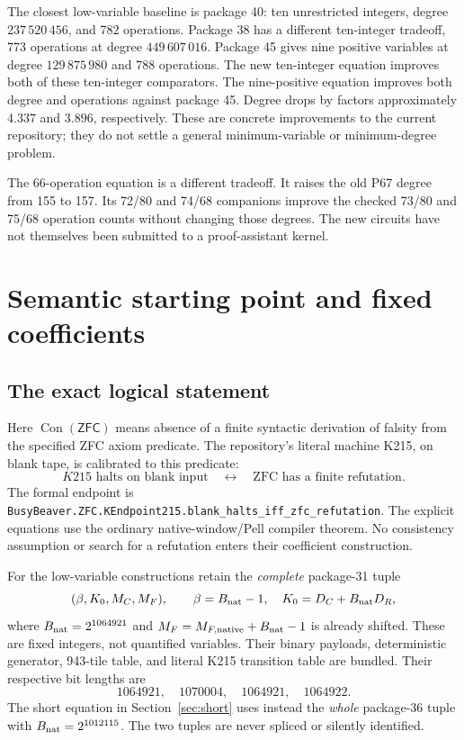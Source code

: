 \documentclass[11pt,letterpaper]{article}
\theoremstyle{remark}\newtheorem{remark}[theorem]{Remark}
\newcommand{\Con}{\operatorname{Con}}\newcommand{\ZFC}{\mathsf{ZFC}}
\newcommand{\file}[1]{\nolinkurl{#1}}
\begin{document}
The closest low-variable baseline is package 40: ten unrestricted
integers, degree $237\,520\,456$, and 782 operations. Package 38 has a
different ten-integer tradeoff, 773 operations at degree $449\,607\,016$.
Package 45 gives nine positive variables at degree $129\,875\,980$ and
788 operations. The new ten-integer equation improves both of these
ten-integer comparators. The nine-positive equation improves both degree
and operations against package 45. Degree drops by factors approximately
$4.337$ and $3.896$, respectively. These are concrete improvements to the
current repository; they do not settle a general minimum-variable or
minimum-degree problem.

The 66-operation equation is a different tradeoff. It raises the old P67
degree from 155 to 157. Its 72/80 and 74/68 companions improve the checked
73/80 and 75/68 operation counts without changing those degrees. The
new circuits have not themselves been submitted to a proof-assistant kernel.

\section{Semantic starting point and fixed coefficients}\label{sec:dependencies}
\subsection{The exact logical statement}
Here $\Con(\ZFC)$ means absence of a finite syntactic derivation of falsity
from the specified ZFC axiom predicate. The repository's literal machine
K215, on blank tape, is calibrated to this predicate:
\begin{equation}\label{eq:machine}
K215\text{ halts on blank input}
\quad\longleftrightarrow\quad
\text{ZFC has a finite refutation}.
\end{equation}
The formal endpoint is
\file{BusyBeaver.ZFC.KEndpoint215.blank_halts_iff_zfc_refutation}.
The explicit equations use the ordinary native-window/Pell compiler
theorem. No consistency assumption or search for a refutation enters
their coefficient construction.

For the low-variable constructions retain the \emph{complete} package-31
tuple
\[
(\beta,K_0,M_C,M_F),\qquad
\beta=B_{\rm nat}-1,\quad K_0=D_C+B_{\rm nat}D_R,
\]
where $B_{\rm nat}=2^{1064921}$ and
$M_F=M_{F,\rm native}+B_{\rm nat}-1$ is already shifted.
These are fixed integers, not quantified variables. Their binary payloads,
deterministic generator, 943-tile table, and literal K215 transition table
are bundled. Their respective bit lengths are
\[
1064921,\quad1070004,\quad1064921,\quad1064922.
\]
The short equation in Section~\ref{sec:short} uses instead the
\emph{whole} package-36 tuple with $B_{\rm nat}=2^{1012115}$.
The two tuples are never spliced or silently identified.
\end{document}
